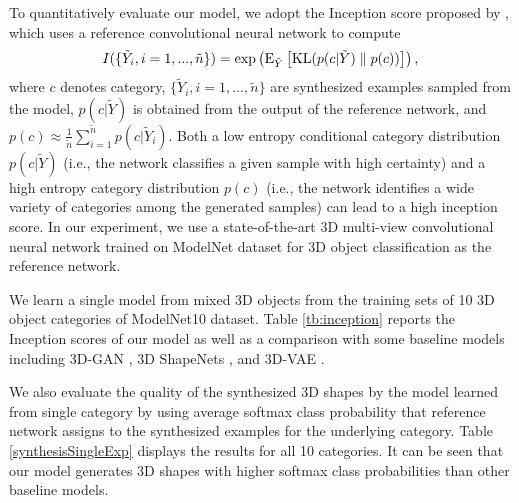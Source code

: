 \documentclass[10pt,twocolumn,letterpaper]{article}
\def\E{{\rm E}}
\def\KL{{\rm KL}}
\def\tY{\tilde{Y}}
\begin{document}
To quantitatively evaluate our model, we adopt the Inception score proposed by \cite{warde2016improving}, which uses a reference convolutional neural network to compute  
\begin{eqnarray} 
I(\{\tY_i,i=1,...,\tilde{n}\})=\exp\left( \E_{\tY}\left[ \KL( p(c|\tY)\parallel p(c))\right]\right), \nonumber 
\end{eqnarray} 
where $c$ denotes category, $\{\tY_i,i=1,...,\tilde{n}\}$ are synthesized examples sampled from the model, $p(c|\tY)$ is obtained from the output of the reference network, and $p(c)
\approx \frac{1}{\tilde{n}} \sum_{i=1}^{\tilde{n}} p(c|\tY_i)$. Both a low entropy conditional category distribution $p(c|\tY)$ (i.e., the  network classifies a given sample with high certainty) and a high entropy category distribution $p(c)$ (i.e., the network identifies a wide variety of categories among the generated samples) can lead to a high inception score. In our experiment, we use a state-of-the-art 3D multi-view convolutional neural network \cite{qi2016volumetric} trained on ModelNet dataset for 3D object classification as the reference network.

We learn a single model from mixed 3D objects from the training sets of 10 3D object categories of ModelNet10 dataset.
Table \ref{tb:inception} reports the Inception scores of our model as well as a comparison with some baseline models including 3D-GAN \cite{3dgan}, 3D ShapeNets \cite{wu20153d}, and 3D-VAE \cite{kingma2013auto}.

We also evaluate the quality of the synthesized 3D shapes by the model learned from single category by using average softmax class probability that reference network assigns to the synthesized examples for the underlying category. 
Table \ref{synthesisSingleExp} displays the results for all 10 categories. It can be seen that our model generates 3D shapes with higher softmax class probabilities than other baseline models. 
\end{document}
